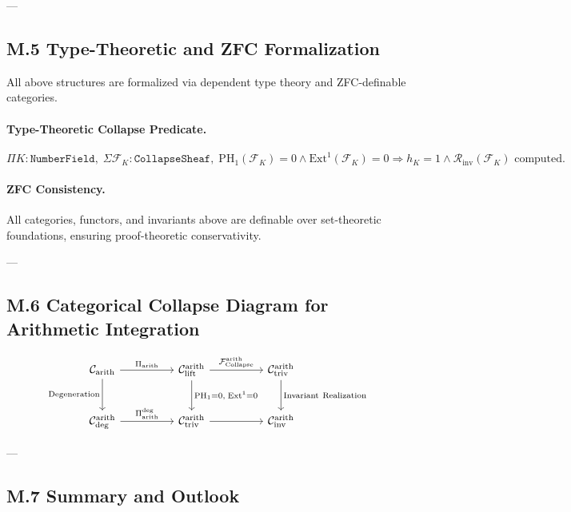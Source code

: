 \documentclass[11pt]{article}
\begin{document}
---

\subsection*{M.5 Type-Theoretic and ZFC Formalization}

All above structures are formalized via dependent type theory and ZFC-definable categories.

\paragraph{Type-Theoretic Collapse Predicate.}
\[
\Pi K : \texttt{NumberField}, \;
\Sigma \mathcal{F}_K : \texttt{CollapseSheaf}, \;
\mathrm{PH}_1(\mathcal{F}_K) = 0 \wedge \mathrm{Ext}^1(\mathcal{F}_K) = 0
\Rightarrow 
h_K = 1 \wedge \mathcal{R}_{\mathrm{inv}}(\mathcal{F}_K) \text{ computed}.
\]

\paragraph{ZFC Consistency.}
All categories, functors, and invariants above are definable over set-theoretic foundations, ensuring proof-theoretic conservativity.

---

\subsection*{M.6 Categorical Collapse Diagram for Arithmetic Integration}

\[
\begin{tikzcd}[column sep=huge, row sep=large]
\mathcal{C}_{\mathrm{arith}} \arrow[r, "{\Pi_{\mathrm{arith}}}"] \arrow[d, "{\mathrm{Degeneration}}"']
& \mathcal{C}_{\mathrm{lift}}^{\mathrm{arith}} \arrow[r, "{\mathcal{F}_{\mathrm{Collapse}}^{\mathrm{arith}}}"] \arrow[d, "{\mathrm{PH}_1 = 0,\; \mathrm{Ext}^1 = 0}"]
& \mathcal{C}_{\mathrm{triv}}^{\mathrm{arith}} \arrow[d, "{\mathrm{Invariant\ Realization}}"] \\
\mathcal{C}_{\mathrm{deg}}^{\mathrm{arith}} \arrow[r, "{\Pi_{\mathrm{arith}}^{\mathrm{deg}}}"]
& \mathcal{C}_{\mathrm{triv}}^{\mathrm{arith}} \arrow[r]
& \mathcal{C}_{\mathrm{inv}}^{\mathrm{arith}}
\end{tikzcd}
\]

---

\subsection*{M.7 Summary and Outlook}
\end{document}
